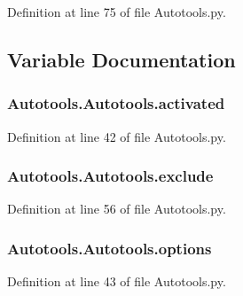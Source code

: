 Definition at line 75 of file Autotools.\-py.



\subsection{Variable Documentation}
\hypertarget{group___tools_ga6bbb714a91bc8b6fe749326772b073b3}{
\subsubsection[{activated}]{\setlength{\rightskip}{0pt plus 5cm}Autotools.\-Autotools.\-activated}}\label{group___tools_ga6bbb714a91bc8b6fe749326772b073b3}


Definition at line 42 of file Autotools.\-py.

\hypertarget{group___tools_gaee37d9789ea22ee310ebc357cd721b7f}{
\subsubsection[{exclude}]{\setlength{\rightskip}{0pt plus 5cm}Autotools.\-Autotools.\-exclude}}\label{group___tools_gaee37d9789ea22ee310ebc357cd721b7f}


Definition at line 56 of file Autotools.\-py.

\hypertarget{group___tools_ga8b348e19f0a7104bde9c43c3a6ed695d}{
\subsubsection[{options}]{\setlength{\rightskip}{0pt plus 5cm}Autotools.\-Autotools.\-options}}\label{group___tools_ga8b348e19f0a7104bde9c43c3a6ed695d}


Definition at line 43 of file Autotools.\-py.

